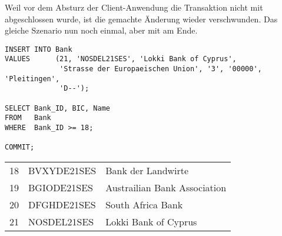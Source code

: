 Weil vor dem Absturz der Client-Anwendung die Transaktion nicht mit
\COMMIT{} abgeschlossen wurde, ist die gemachte Änderung wieder
verschwunden. Das gleiche Szenario nun noch einmal, aber mit \COMMIT{}
am Ende.
\begin{lstlisting}[language=oracle_sql,label=sql07_26]
INSERT INTO Bank
VALUES      (21, 'NOSDEL21SES', 'Lokki Bank of Cyprus',
             'Strasse der Europaeischen Union', '3', '00000', 'Pleitingen',
             'D--');

SELECT Bank_ID, BIC, Name
FROM   Bank
WHERE  Bank_ID >= 18;

COMMIT;
          \end{lstlisting}
\begin{center}
    \begin{small}
        \tablehead{}
        \tabletail {
        }
        \begin{msoraclesql}
            \begin{supertabular}{rll}
                18 & BVXYDE21SES & Bank der Landwirte \\
                19 & BGIODE21SES & Austrailian Bank Association \\
                20 & DFGHDE21SES & South Africa Bank \\
                21 & NOSDEL21SES & Lokki Bank of Cyprus  \\
            \end{supertabular}
        \end{msoraclesql}
    \end{small}
\end{center}

